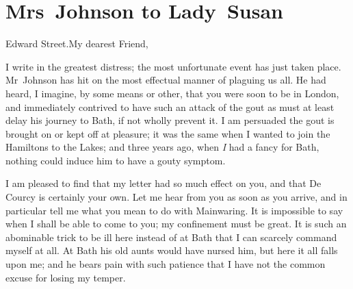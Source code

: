 \chapter{Mrs~Johnson to Lady~Susan}
  
  \begin{mail}{Edward Street.}{My dearest Friend,}
  
I write in the greatest distress; the most unfortunate event has just taken place. Mr~Johnson has hit on the most effectual manner of plaguing us all. He had heard, I imagine, by some means or other, that you were soon to be in London, and immediately contrived to have such an attack of the gout as must at least delay his journey to Bath, if not wholly prevent it. I am persuaded the gout is brought on or kept off at pleasure; it was the same when I wanted to join the Hamiltons to the Lakes; and three years ago, when \textit{I} had a fancy for Bath, nothing could induce him to have a gouty symptom.

I am pleased to find that my letter had so much effect on you, and that De Courcy is certainly your own. Let me hear from you as soon as you arrive, and in particular tell me what you mean to do with Mainwaring. It is impossible to say when I shall be able to come to you; my confinement must be great. It is such an abominable trick to be ill here instead of at Bath that I can scarcely command myself at all. At Bath his old aunts would have nursed him, but here it all falls upon me; and he bears pain with such patience that I have not the common excuse for losing my temper. 

\end{mail}